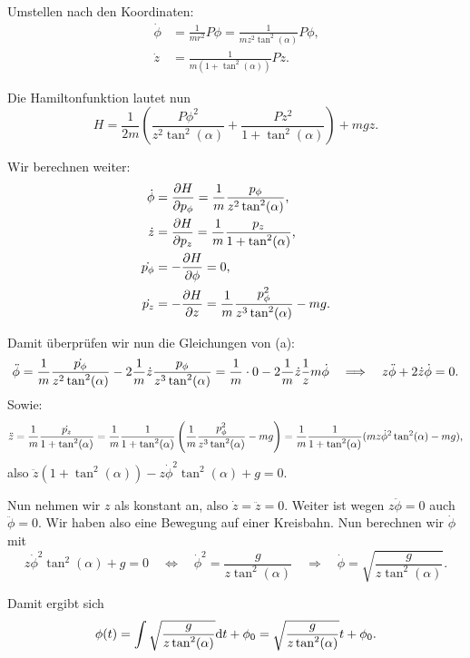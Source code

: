 Umstellen nach den Koordinaten:
\begin{align*}
	\dot{\phi} &= \frac{1}{m r^2} P \phi = \frac{1}{m z^2 \tan^2(\alpha)} P \phi \text{,} \\
	\dot{z} &= \frac{1}{m (1 + \tan^2(\alpha))} P z \text{.}	
\end{align*}

Die Hamiltonfunktion lautet nun
\[
	H = \frac{1}{2m} \left( \frac{P \phi^2}{z^2 \tan^2(\alpha)} + \frac{P z^2}{1 + \tan^2(\alpha)} \right) + mgz \text{.}
\]

Wir berechnen weiter:
\begin{align*}
	\dot{\phi} &= \frac{\partial H}{\partial p_\phi} = \frac{1}{m} \frac{p_\phi}{z^2 \tan^2(\alpha)} \text{,} \\
	\dot{z} &= \frac{\partial H}{\partial p_z} = \frac{1}{m} \frac{p_z}{1 + \tan^2(\alpha)} \text{,} \\
	\dot{p_\phi} &= - \frac{\partial H}{\partial \phi} = 0 \text{,} \\
	\dot{p_z} &= - \frac{\partial H}{\partial z} = \frac{1}{m} \frac{p_\phi^2}{z^3 \tan^2(\alpha)} - mg \text{.}
\end{align*}

Damit überprüfen wir nun die Gleichungen von (a):
\[
	\ddot{\phi} = \frac{1}{m} \frac{\dot{p_\phi}}{z^2 \tan^2(\alpha)} - 2 \frac{1}{m} \dot{z} \frac{p_\phi}{z^3 \tan^2(\alpha)} = \frac{1}{m} \cdot 0 - 2 \frac{1}{m} \dot{z} \frac{1}{z} m \dot{\phi}
	\quad \Longrightarrow \quad 
	z \ddot{\phi} + 2 \dot{z} \dot{\phi} = 0 
	\text{.}
\]
Sowie:
\[
	\ddot{z} 
	= \frac{1}{m} \frac{\dot{p_z}}{1 + \tan^2(\alpha)} 
	= \frac{1}{m} \frac{1}{1 + \tan^2(\alpha)} \left( \frac{1}{m} \frac{p_\phi^2}{z^3 \tan^2(\alpha)} - mg \right)
	= \frac{1}{m} \frac{1}{1 + \tan^2(\alpha)} (m z \dot{\phi}^2 \tan^2(\alpha) - mg) \text{,}
\]
also $\ddot{z} (1 + \tan^2(\alpha)) - z \dot{\phi}^2 \tan^2(\alpha) + g = 0$.

Nun nehmen wir $z$ als konstant an, also $\dot{z} = \ddot{z} = 0$. Weiter ist wegen $z \ddot{\phi} = 0$ auch $\ddot{\phi} = 0$. Wir haben also eine Bewegung auf einer Kreisbahn. Nun berechnen wir $\dot{\phi}$ mit
\[
	z \dot{\phi}^2 \tan^2(\alpha) + g = 0
	\quad \Longleftrightarrow \quad 
	\dot{\phi}^2 = \frac{g}{z \tan^2(\alpha)}
	\quad \Longrightarrow \quad 
	\dot{\phi} = \sqrt{\frac{g}{z \tan^2(\alpha)}} 
	\text{.}
\]

Damit ergibt sich 
\[
	\phi(t) = \int \sqrt{\frac{g}{z \tan^2(\alpha)}} \mathrm{d} t + \phi_0 = \sqrt{\frac{g}{z \tan^2(\alpha)}} t + \phi_0
	\text{.}
\]

